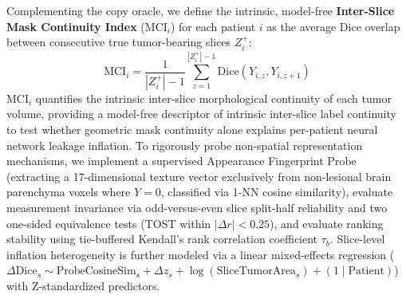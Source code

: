 \documentclass[11pt,a4paper]{article}
\begin{document}
Complementing the copy oracle, we define the intrinsic, model-free \textbf{Inter-Slice Mask Continuity Index} ($\text{MCI}_i$) for each patient $i$ as the average Dice overlap between consecutive true tumor-bearing slices $Z_i^+$:
\begin{equation}
\text{MCI}_i = \frac{1}{|Z_i^+| - 1} \sum_{z=1}^{|Z_i^+|-1} \text{Dice}(Y_{i,z}, Y_{i,z+1})
\end{equation}
$\text{MCI}_i$ quantifies the intrinsic inter-slice morphological continuity of each tumor volume, providing a model-free descriptor of intrinsic inter-slice label continuity to test whether geometric mask continuity alone explains per-patient neural network leakage inflation. To rigorously probe non-spatial representation mechanisms, we implement a supervised Appearance Fingerprint Probe (extracting a 17-dimensional texture vector exclusively from non-lesional brain parenchyma voxels where $Y=0$, classified via 1-NN cosine similarity), evaluate measurement invariance via odd-versus-even slice split-half reliability and two one-sided equivalence tests (TOST within $|\Delta r| < 0.25$), and evaluate ranking stability using tie-buffered Kendall's rank correlation coefficient $\tau_b$. Slice-level inflation heterogeneity is further modeled via a linear mixed-effects regression ($\Delta\text{Dice}_s \sim \text{ProbeCosineSim}_s + \Delta z_s + \log(\text{SliceTumorArea}_s) + (1 \mid \text{Patient})$) with Z-standardized predictors.
\end{document}

